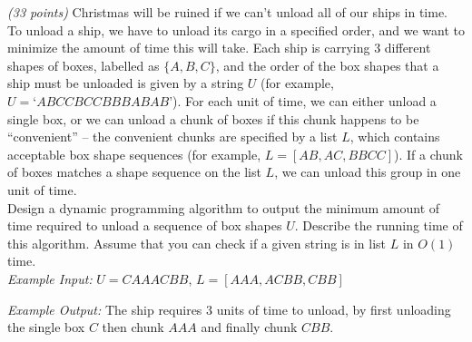 \documentclass{article}
\newcounter{ProblemCounter}
\newenvironment{problem}[1][Problem]{
 \begin{trivlist}
 \item[\hskip \labelsep {\bfseries #1}\hskip \labelsep {%
 \bfseries \theProblemCounter.%
 \stepcounter{ProblemCounter}%
 }]
}{
 \end{trivlist}
}
\begin{document}
\begin{problem}\textit{(33 points)} Christmas will be ruined if we can't unload all of our ships in time. To unload a ship, we have to unload its cargo in a specified order, and we want to minimize the amount of time this will take. Each ship is carrying 3 different shapes of boxes, labelled as $\{A, B, C\}$, and the order of the box shapes that a ship must be unloaded is given by a string $U$ (for example, $U = \text{`}ABCCBCCBBBABAB\text{'}$). For each unit of time, we can either unload a single box, or we can unload a chunk of boxes if this chunk happens to be ``convenient'' -- the convenient chunks are specified by a list $L$, which contains acceptable box shape sequences (for example, $L = [AB, AC, BBCC]$). If a chunk of boxes matches a shape sequence on the list $L$, we can unload this group in one unit of time.\\

\noindent Design a dynamic programming algorithm to output the minimum amount of time required to unload a sequence of box shapes $U$. Describe the running time of this algorithm. Assume that you can check if a given string is in list $L$ in $O(1)$ time.\\

\noindent \textit{Example Input: } $U=CAAACBB$, $L = [AAA, ACBB, CBB]$

\noindent \textit{Example Output: } The ship requires 3 units of time to unload, by first unloading the single box $C$ then chunk $AAA$ and finally chunk $CBB$.


\end{problem}
\end{document}
